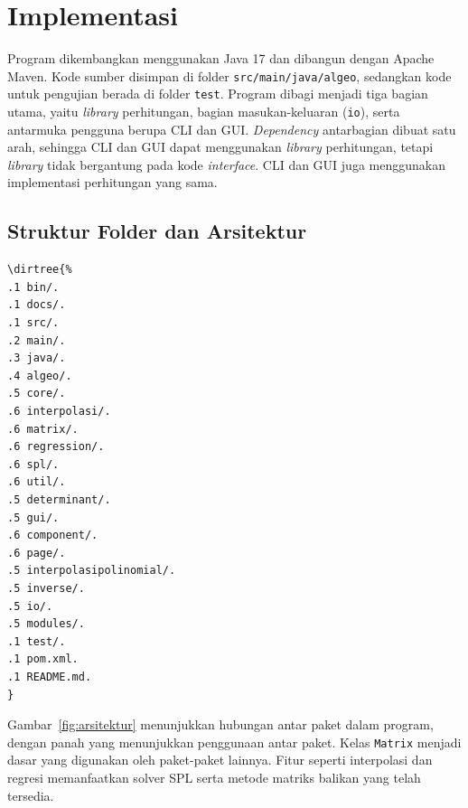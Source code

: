 \clearpage
\section{Implementasi}

Program dikembangkan menggunakan Java 17 dan dibangun dengan Apache Maven. Kode sumber disimpan di folder \texttt{src/main/java/algeo}, sedangkan kode untuk pengujian berada di folder \texttt{test}. Program dibagi menjadi tiga bagian utama, yaitu \textit{library} perhitungan, bagian masukan-keluaran (\texttt{io}), serta antarmuka pengguna berupa CLI dan GUI. \textit{Dependency} antarbagian dibuat satu arah, sehingga CLI dan GUI dapat menggunakan \textit{library} perhitungan, tetapi \textit{library} tidak bergantung pada kode \textit{interface}. CLI dan GUI juga menggunakan implementasi perhitungan yang sama.


\subsection{Struktur Folder dan Arsitektur}

\begin{lstlisting}
\dirtree{%
.1 bin/.
.1 docs/.
.1 src/.
.2 main/.
.3 java/.
.4 algeo/.
.5 core/.
.6 interpolasi/.
.6 matrix/.
.6 regression/.
.6 spl/.
.6 util/.
.5 determinant/.
.5 gui/.
.6 component/.
.6 page/.
.5 interpolasipolinomial/.
.5 inverse/.
.5 io/.
.5 modules/.
.1 test/.
.1 pom.xml.
.1 README.md.
}
\end{lstlisting}

Gambar~\ref{fig:arsitektur} menunjukkan hubungan antar paket dalam program, dengan panah yang menunjukkan penggunaan antar paket. Kelas \texttt{Matrix} menjadi dasar yang digunakan oleh paket-paket lainnya. Fitur seperti interpolasi dan regresi memanfaatkan solver SPL serta metode matriks balikan yang telah tersedia.

